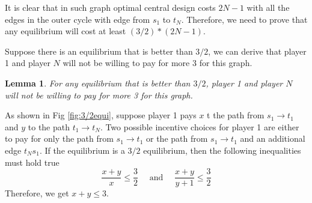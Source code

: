 \documentclass[11pt,psfig,times]{article}
\newtheorem{lemma}{Lemma}[section]
\begin{document}
	It is clear that in such graph optimal central design costs $2N-1$ with all the edges in the outer cycle with edge from $s_1$ to $t_N$. Therefore, we need to prove that any equilibrium will cost at least $(3/2)*(2N-1)$.
	
	Suppose there is an equilibrium that is better than $3/2$, we can derive that player 1 and player $N$ will not be willing to pay for more 3 for this graph. 

	\begin{lemma}
		For any equilibrium that is better than $3/2$, player 1 and player $N$ will not be willing to pay for more 3 for this graph.
	\end{lemma}
	As shown in Fig \ref{fig:3/2equi}, suppose player 1 pays $x$ t the path from $s_1 \rightarrow t_1$ and $y$ to the path $t_1 \rightarrow t_N$. Two possible incentive choices for player 1 are either to pay for only the path from $s_1 \rightarrow t_1$ or the path from $s_1 \rightarrow t_1$ and an additional edge $t_Ns_1$. If the equilibrium is a $3/2$ equilibrium, then the following inequalities must hold true \[\frac{x+y}{x} \leq \frac{3}{2}\quad \text{ and }\quad\frac{x+y}{y+1} \leq \frac{3}{2}\]
	Therefore, we get $x+y\leq 3$.
	
\end{document}
